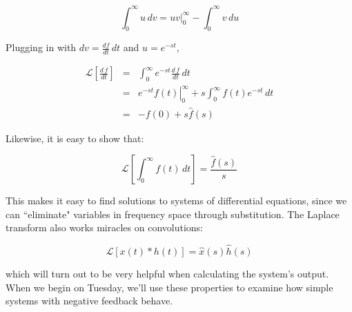 \documentclass{article}
\newcommand{\Lapl}{\mathscr{L}}
\begin{document}
\[ \int_0^{\infty} u \, dv = \left. uv \right|_0^{\infty} - \int_0^{\infty} v \, du \]

Plugging in with  $dv = \frac{df}{dt} \, dt$ and $u = e^{-st}$,

\begin{eqnarray*}
\Lapl \left[ \frac{d\, f}{dt} \right]  & = & \int_0^{\infty} e^{-s t} \frac{d\, f}{dt} \, dt\\
& = & \left. e^{-s t} f(t) \right|_0^{\infty} + s \int_0^{\infty} f(t) e^{-st} \, dt\\
& = &  -f(0) + s \hat{f}(s)
\end{eqnarray*}

Likewise, it is easy to show that:

\[ \Lapl \left[ \int_0^{\infty} f(t) \, dt \right] = \frac{\hat{f}(s)}{s} \]

This makes it easy to find solutions to systems of differential equations, since we can ``eliminate" variables in frequency space through substitution. The Laplace transform also works miracles on convolutions:

\[ \Lapl \left[x(t) \ast h(t) \right] = \hat{x}(s) \hat{h}(s) \]

which will turn out to be very helpful when calculating the system's output. When we begin on Tuesday, we'll use these properties to examine how simple systems with negative feedback behave.
\end{document}
